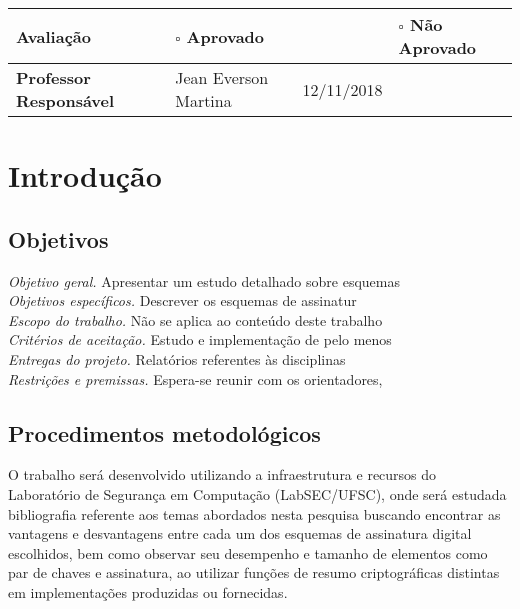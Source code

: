 \documentclass{ufsctex/ufsctex}
\begin{document}
\begin{table}[hbpt]
  \vspace{2mm}
  {\footnotesize
  \begin{tabular}{|>{\bfseries}p{3cm}|l|l|l|}
    \hline Avaliação & \multicolumn{2}{l}{\bf $\square$ Aprovado}
      & \textbf{$\square$ Não Aprovado} \\
    \hline Professor Responsável & Jean Everson Martina & 12/11/2018 & \\
    \hline
  \end{tabular}}
\end{table}

\paginaresumo

\sumario

\chapter{Introdução}


\section{Objetivos}

\noindent \emph{Objetivo geral.} Apresentar um estudo detalhado sobre esquemas
\\

\noindent \emph{Objetivos específicos.} Descrever os esquemas de assinatur
\\

\noindent \emph{Escopo do trabalho.} Não se aplica ao conteúdo deste trabalho
\\

\noindent \emph{Critérios de aceitação.} Estudo e implementação de pelo menos
\\

\noindent \emph{Entregas do projeto.} Relatórios referentes às disciplinas 
\\

\noindent \emph{Restrições e premissas.} Espera-se reunir com os orientadores,

\section{Procedimentos metodológicos}

O trabalho será desenvolvido utilizando a infraestrutura e recursos do
Laboratório de Segurança em Computação (LabSEC/UFSC), onde será estudada
bibliografia referente aos temas abordados nesta pesquisa buscando encontrar
as vantagens e desvantagens entre cada um dos esquemas de assinatura digital
escolhidos, bem como observar seu desempenho e tamanho de elementos como
par de chaves e assinatura, ao utilizar funções de resumo criptográficas
distintas em implementações produzidas ou fornecidas.
\end{document}
